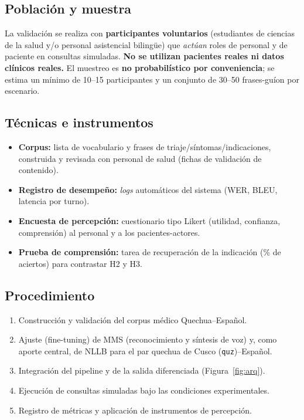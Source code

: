\documentclass[12pt,a4paper]{article}
\begin{document}
\subsection{Poblaci{\'o}n y muestra}
La validaci{\'o}n se realiza con \textbf{participantes voluntarios} (estudiantes de ciencias de
la salud y/o personal asistencial bilingüe) que \emph{act{\'u}an} roles de personal y de
paciente en consultas simuladas. \textbf{No se utilizan pacientes reales ni datos cl{\'i}nicos
reales.} El muestreo es \textbf{no probabil{\'i}stico por conveniencia}; se estima un m{\'i}nimo
de 10--15 participantes y un conjunto de 30--50 frases-gu{\'i}on por escenario.

\subsection{T{\'e}cnicas e instrumentos}
\begin{itemize}
  \item \textbf{Corpus:} lista de vocabulario y frases de triaje/s{\'i}ntomas/indicaciones,
        construida y revisada con personal de salud (fichas de validaci{\'o}n de contenido).
  \item \textbf{Registro de desempe{\~n}o:} \emph{logs} autom{\'a}ticos del sistema (WER, BLEU,
        latencia por turno).
  \item \textbf{Encuesta de percepci{\'o}n:} cuestionario tipo Likert (utilidad, confianza,
        comprensi{\'o}n) al personal y a los pacientes-actores.
  \item \textbf{Prueba de comprensi{\'o}n:} tarea de recuperaci{\'o}n de la indicaci{\'o}n
        (\% de aciertos) para contrastar H2 y H3.
\end{itemize}

\subsection{Procedimiento}
\begin{enumerate}
  \item Construcci{\'o}n y validaci{\'o}n del corpus m{\'e}dico Quechua--Espa{\~n}ol.
  \item Ajuste (fine-tuning) de MMS (reconocimiento y s{\'i}ntesis de voz) y, como aporte central, de NLLB para el par quechua de Cusco (\texttt{quz})--Espa{\~n}ol.
  \item Integraci{\'o}n del pipeline y de la salida diferenciada (Figura~\ref{fig:arq}).
  \item Ejecuci{\'o}n de consultas simuladas bajo las condiciones experimentales.
  \item Registro de m{\'e}tricas y aplicaci{\'o}n de instrumentos de percepci{\'o}n.
\end{enumerate}
\end{document}
